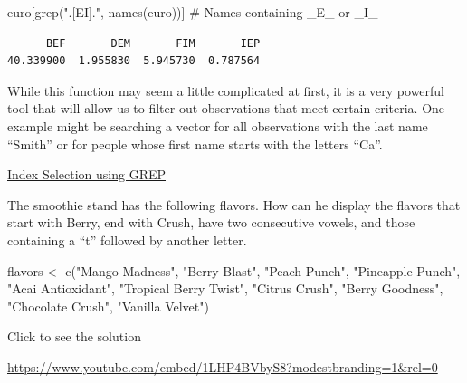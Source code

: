 \documentclass[
  letterpaper,
  DIV=11,
  numbers=noendperiod]{scrreprt}
\newenvironment{Shaded}{\begin{snugshade}}{\end{snugshade}}
\newcommand{\CommentTok}[1]{\textcolor[rgb]{0.37,0.37,0.37}{#1}}
\newcommand{\FunctionTok}[1]{\textcolor[rgb]{0.28,0.35,0.67}{#1}}
\newcommand{\NormalTok}[1]{\textcolor[rgb]{0.00,0.23,0.31}{#1}}
\newcommand{\OtherTok}[1]{\textcolor[rgb]{0.00,0.23,0.31}{#1}}
\newcommand{\StringTok}[1]{\textcolor[rgb]{0.13,0.47,0.30}{#1}}
\begin{document}
\begin{Shaded}
\begin{Highlighting}[]
\NormalTok{euro[}\FunctionTok{grep}\NormalTok{(}\StringTok{".[EI]."}\NormalTok{, }\FunctionTok{names}\NormalTok{(euro))] }\CommentTok{\# Names containing \_E\_ or \_I\_}
\end{Highlighting}
\end{Shaded}

\begin{verbatim}
      BEF       DEM       FIM       IEP 
40.339900  1.955830  5.945730  0.787564 
\end{verbatim}

While this function may seem a little complicated at first, it is a very
powerful tool that will allow us to filter out observations that meet
certain criteria. One example might be searching a vector for all
observations with the last name ``Smith'' or for people whose first name
starts with the letters ``Ca''.

\begin{watch}{}{}
    \href{https://youtu.be/BDRppgPi8-E}{Index Selection using GREP}
\end{watch}

\begin{tcolorbox}[enhanced jigsaw, colbacktitle=quarto-callout-tip-color!10!white, breakable, bottomrule=.15mm, colframe=quarto-callout-tip-color-frame, left=2mm, opacitybacktitle=0.6, title=\textcolor{quarto-callout-tip-color}{\faLightbulb}\hspace{0.5em}{Try it Out}, leftrule=.75mm, opacityback=0, rightrule=.15mm, titlerule=0mm, bottomtitle=1mm, colback=white, toprule=.15mm, arc=.35mm, toptitle=1mm, coltitle=black]

The smoothie stand has the following flavors. How can he display the
flavors that start with Berry, end with Crush, have two consecutive
vowels, and those containing a ``t'' followed by another letter.

\begin{Shaded}
\begin{Highlighting}[]
\NormalTok{flavors }\OtherTok{\textless{}{-}} \FunctionTok{c}\NormalTok{(}\StringTok{"Mango Madness"}\NormalTok{, }\StringTok{"Berry Blast"}\NormalTok{, }\StringTok{"Peach Punch"}\NormalTok{, }\StringTok{"Pineapple Punch"}\NormalTok{, }
             \StringTok{"Acai Antioxidant"}\NormalTok{, }\StringTok{"Tropical Berry Twist"}\NormalTok{, }\StringTok{"Citrus Crush"}\NormalTok{, }
             \StringTok{"Berry Goodness"}\NormalTok{, }\StringTok{"Chocolate Crush"}\NormalTok{, }\StringTok{"Vanilla Velvet"}\NormalTok{)}
\end{Highlighting}
\end{Shaded}

Click to see the solution

\url{https://www.youtube.com/embed/1LHP4BVbyS8?modestbranding=1&rel=0}

\end{tcolorbox}
\end{document}
